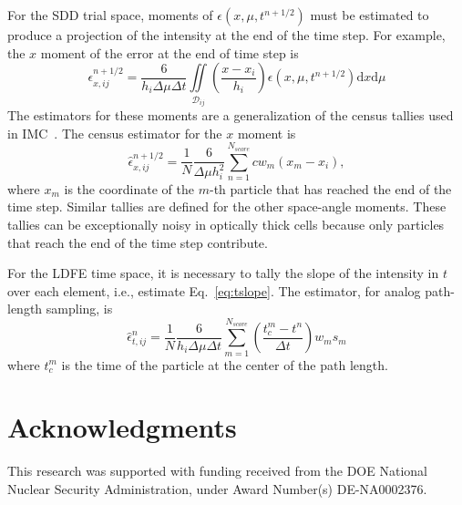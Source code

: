 \documentclass{anstrans}
\renewcommand{\d}{\mathrm{d}}
\begin{document}
For the SDD trial space, moments of $\epsilon(x,\mu,t^{n+1/2})$ must be estimated to produce a projection of the intensity at
the end of the time step.
For example, the $x$ moment of the error at the end of time step is
\begin{equation}
    \epsilon^{n+1/2}_{x,ij} = \frac{6}{h_i\Delta \mu \Delta t} \iint\limits_{\mathcal{D}_{ij}} \left(\frac{x
    - x_i}{h_i}\right) \epsilon(x,\mu,t^{n+1/2}) \d x \d \mu
\end{equation}
The estimators for these moments are a generalization of the census
tallies used in IMC~\cite{wollaber_review,fnc}.   The census estimator for the $x$ moment is
\begin{equation}
    \hat\epsilon^{n+1/2}_{x,ij} = \frac{1}{N} \frac{6}{\Delta \mu h_i^2} \sum_{n=1}^{N_{score}}
    c w_m  \left(x_{m} - x_{i}\right),
\end{equation}
where $x_m$ is the coordinate of the $m$-th particle that has reached the end of the time step.
Similar tallies are defined for the other space-angle moments. These tallies can be
exceptionally noisy in optically thick cells because only particles that reach the end of the time step contribute.

For the LDFE time space, it is necessary to tally the slope of the intensity in $t$ over each
element, i.e., estimate Eq.~\eqref{eq:tslope}.  The estimator, for analog path-length sampling, is
\begin{equation}
    \hat\epsilon^{n}_{t,ij} = \frac{1}{N} \frac{6}{h_i\Delta \mu\Delta t} \sum_{m=1}^{N_{score}} 
    \left(\frac{t_c^m
    - t^n}{\Delta t}\right) w_m s_m
\end{equation}
where $t_c^m$ is the time of the particle at the center of the path length.

\section{Acknowledgments}

This research was supported with funding received from the DOE National
Nuclear Security Administration, under Award Number(s) DE-NA0002376. 


\end{document}
